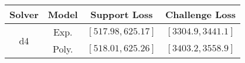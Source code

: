 \begin{tabular}{cc|c|c} 
\hline 
 Solver & Model & Support Loss  & Challenge Loss \tabularnewline\hline 
\hline 
\multirow{2}{*}{d4} & Exp. & $\left[517.98,625.17\right]$ & $\left[3304.9,3441.1\right]$ \tabularnewline 
 & Poly. & $\left[518.01,625.26\right]$ & $\left[3403.2,3558.9\right]$ \tabularnewline 
\hline 
\end{tabular} 

